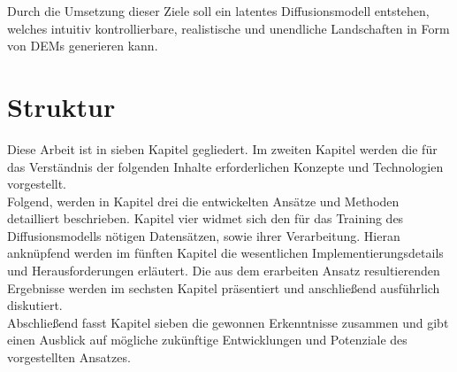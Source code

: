 Durch die Umsetzung dieser Ziele soll ein latentes Diffusionsmodell entstehen, welches intuitiv kontrollierbare, realistische und unendliche Landschaften in Form von \ac{DEM}s generieren kann.

\section{Struktur}

Diese Arbeit ist in sieben Kapitel gegliedert. Im zweiten Kapitel werden die für das Verständnis der folgenden Inhalte erforderlichen Konzepte und Technologien vorgestellt. \\
Folgend, werden in Kapitel drei die entwickelten Ansätze und Methoden detailliert beschrieben. Kapitel vier widmet sich den für das Training des Diffusionsmodells nötigen Datensätzen, sowie ihrer Verarbeitung. Hieran anknüpfend werden im fünften Kapitel die wesentlichen Implementierungsdetails und Herausforderungen erläutert. Die aus dem erarbeiten Ansatz resultierenden Ergebnisse werden im sechsten Kapitel präsentiert und anschließend ausführlich diskutiert. \\
Abschließend fasst Kapitel sieben die gewonnen Erkenntnisse zusammen und gibt einen Ausblick auf mögliche zukünftige Entwicklungen und Potenziale des vorgestellten Ansatzes.